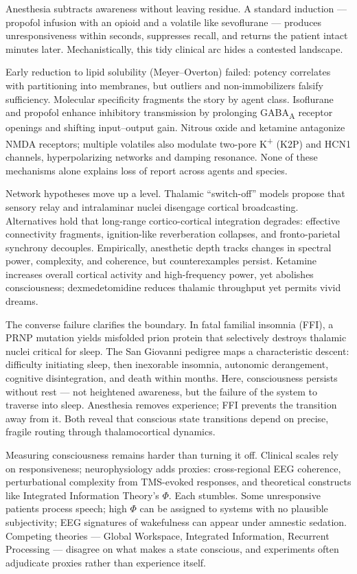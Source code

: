 Anesthesia subtracts awareness without leaving residue. A standard induction — propofol infusion with an opioid and a volatile like sevoflurane — produces unresponsiveness within seconds, suppresses recall, and returns the patient intact minutes later. Mechanistically, this tidy clinical arc hides a contested landscape.

Early reduction to lipid solubility (Meyer--Overton) failed: potency correlates with partitioning into membranes, but outliers and non-immobilizers falsify sufficiency. Molecular specificity fragments the story by agent class. Isoflurane and propofol enhance inhibitory transmission by prolonging GABA\textsubscript{A} receptor openings and shifting input--output gain. Nitrous oxide and ketamine antagonize NMDA receptors; multiple volatiles also modulate two-pore K\textsuperscript{+} (K2P) and HCN1 channels, hyperpolarizing networks and damping resonance. None of these mechanisms alone explains loss of report across agents and species.

Network hypotheses move up a level. Thalamic “switch-off” models propose that sensory relay and intralaminar nuclei disengage cortical broadcasting. Alternatives hold that long-range cortico-cortical integration degrades: effective connectivity fragments, ignition-like reverberation collapses, and fronto-parietal synchrony decouples. Empirically, anesthetic depth tracks changes in spectral power, complexity, and coherence, but counterexamples persist. Ketamine increases overall cortical activity and high-frequency power, yet abolishes consciousness; dexmedetomidine reduces thalamic throughput yet permits vivid dreams.

The converse failure clarifies the boundary. In fatal familial insomnia (FFI), a PRNP mutation yields misfolded prion protein that selectively destroys thalamic nuclei critical for sleep. The San Giovanni pedigree maps a characteristic descent: difficulty initiating sleep, then inexorable insomnia, autonomic derangement, cognitive disintegration, and death within months. Here, consciousness persists without rest — not heightened awareness, but the failure of the system to traverse into sleep. Anesthesia removes experience; FFI prevents the transition away from it. Both reveal that conscious state transitions depend on precise, fragile routing through thalamocortical dynamics.

Measuring consciousness remains harder than turning it off. Clinical scales rely on responsiveness; neurophysiology adds proxies: cross-regional EEG coherence, perturbational complexity from TMS-evoked responses, and theoretical constructs like Integrated Information Theory’s $\Phi$. Each stumbles. Some unresponsive patients process speech; high $\Phi$ can be assigned to systems with no plausible subjectivity; EEG signatures of wakefulness can appear under amnestic sedation. Competing theories — Global Workspace, Integrated Information, Recurrent Processing — disagree on what makes a state conscious, and experiments often adjudicate proxies rather than experience itself.

